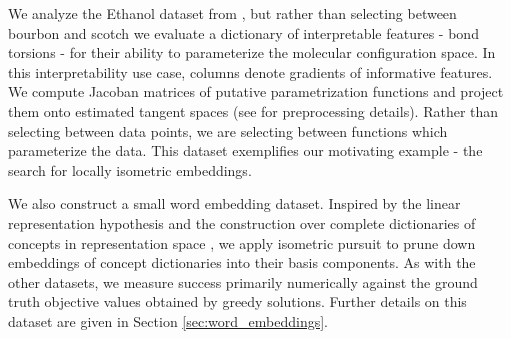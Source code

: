 We analyze the Ethanol dataset from \citet{Chmiela2018-at, Koelle2022-ju}, but rather than selecting between bourbon and scotch we evaluate a dictionary of interpretable features  - bond torsions - for their ability to parameterize the molecular configuration space.
In this interpretability use case, columns denote gradients of informative features.
We compute Jacoban matrices of putative parametrization functions and project them onto estimated tangent spaces (see \citet{Koelle2022-ju} for preprocessing details).
Rather than selecting between data points, we are selecting between functions which parameterize the data.
This dataset exemplifies our motivating example - the search for locally isometric embeddings.

We also construct a small word embedding dataset.
Inspired by the linear representation hypothesis \citep{Park2023-hq,Mikolov2013-lt } and the construction over complete dictionaries of concepts in representation space \citep{templeton2024scaling, Makelov2024-bw}, we apply isometric pursuit to prune down embeddings of concept dictionaries into their basis components.
As with the other datasets, we measure success primarily numerically against the ground truth objective values obtained by greedy solutions.
Further details on this dataset are given in Section \ref{sec:word_embeddings}.

